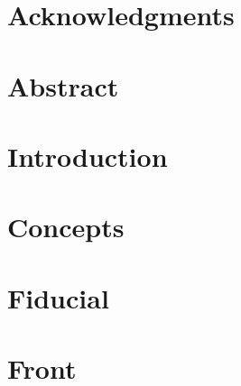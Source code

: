 \documentclass[11pt]{book}
\renewcommand{\baselinestretch}{1.2}
\begin{document}



\newpage
\thispagestyle{empty}
\renewcommand{\thesisdedication}{{\large Copyright \copyright~~Kiran Raj S R, 2016\\}{\large All Rights Reserved\\}}
\thesisdedicationpage



\newpage
\thispagestyle{empty}
\renewcommand{\thesisdedication}{\large To My Family}
\thesisdedicationpage

\mastersthesis
\renewcommand{\baselinestretch}{1.5}

\chapter*{Acknowledgments}
\label{ch:ack}


\chapter*{Abstract}
\label{ch:abstract}


\tableofcontents
\listoffigures
\listoftables

\chapter{Introduction}
\label{ch:chap1}



\chapter{Concepts}
\label{ch:chap2}



\chapter{Fiducial} 
\label{ch:chap3}



\chapter{Front}
\label{ch:chap4}

\end{document}
